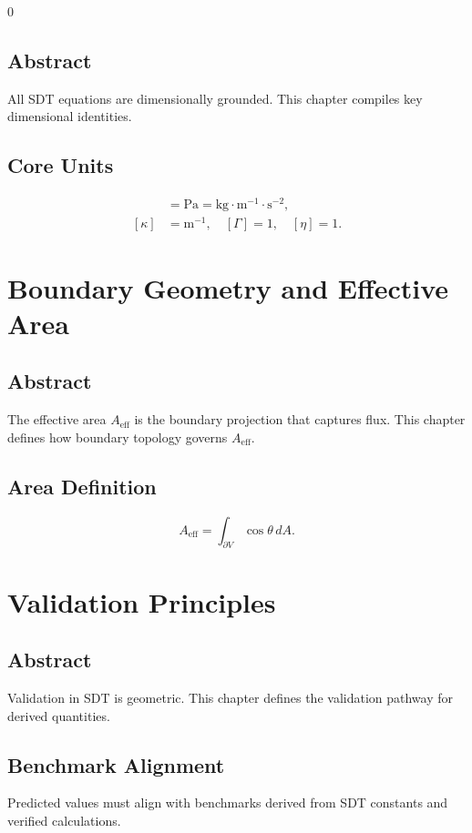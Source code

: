 0\documentclass[12pt]{book}
\begin{document}
\section*{Abstract}
All SDT equations are dimensionally grounded. This chapter compiles key dimensional identities.

\section{Core Units}
\begin{align}
[P] &= \text{Pa} = \text{kg}\cdot \text{m}^{-1}\cdot \text{s}^{-2},\\
[\kappa] &= \text{m}^{-1}, \quad [\Gamma] = 1, \quad [\eta] = 1.
\end{align}

\chapter{Boundary Geometry and Effective Area}

\section*{Abstract}
The effective area $A_{\text{eff}}$ is the boundary projection that captures flux. This chapter defines
how boundary topology governs $A_{\text{eff}}$.

\section{Area Definition}
\begin{equation}
A_{\text{eff}} = \int_{\partial V} \cos\theta \, dA.
\end{equation}

\chapter{Validation Principles}

\section*{Abstract}
Validation in SDT is geometric. This chapter defines the validation pathway for derived quantities.

\section{Benchmark Alignment}
Predicted values must align with benchmarks derived from SDT constants and verified calculations.
\end{document}
